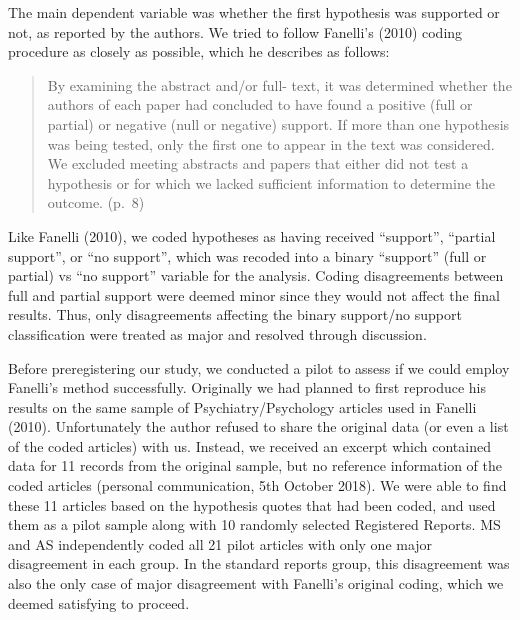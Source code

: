 \documentclass[british,,jou,floatsintext]{apa6}
\begin{document}
The main dependent variable was whether the first hypothesis was supported or not, as reported by the authors.
We tried to follow Fanelli's (2010) coding procedure as closely as possible, which he describes as follows:

\begin{quote}
By examining the abstract and/or full- text, it was determined whether the authors of each paper had concluded to have found a positive (full or partial) or negative (null or negative) support.
If more than one hypothesis was being tested, only the first one to appear in the text was considered.
We excluded meeting abstracts and papers that either did not test a hypothesis or for which we lacked sufficient information to determine the outcome. (p.~8)
\end{quote}

Like Fanelli (2010), we coded hypotheses as having received \enquote{support}, \enquote{partial support}, or \enquote{no support}, which was recoded into a binary \enquote{support} (full or partial) vs \enquote{no support} variable for the analysis.
Coding disagreements between full and partial support were deemed minor since they would not affect the final results. Thus, only disagreements affecting the binary support/no support classification were treated as major and resolved through discussion.

Before preregistering our study, we conducted a pilot to assess if we could employ Fanelli's method successfully.
Originally we had planned to first reproduce his results on the same sample of Psychiatry/Psychology articles used in Fanelli (2010).
Unfortunately the author refused to share the original data (or even a list of the coded articles) with us.
Instead, we received an excerpt which contained data for 11 records from the original sample, but no reference information of the coded articles (personal communication, 5th October 2018).
We were able to find these 11 articles based on the hypothesis quotes that had been coded, and used them as a pilot sample along with 10 randomly selected Registered Reports.
MS and AS independently coded all 21 pilot articles with only one major disagreement in each group.
In the standard reports group, this disagreement was also the only case of major disagreement with Fanelli's original coding, which we deemed satisfying to proceed.
\end{document}

